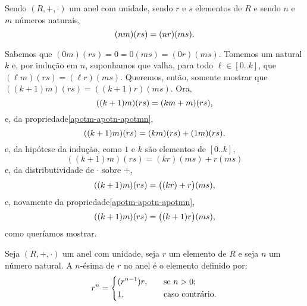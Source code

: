 \begin{Propr}\label{proprnmrsnrms}
  Sendo $(R,+,\cdot)$ um anel com unidade, sendo $r$ e $s$
  elementos de $R$ e
  sendo $n$ e $m$ números naturais,
  \begin{equation*}
    (nm)(rs) = (nr)(ms)\mathrm{.}
  \end{equation*}
\end{Propr}

\begin{dem}
  Sabemos que $(0m)(rs) = 0 = 0(ms) = (0r)(ms)$. Tomemos um natural $k$
  e, por indução em $n$,
  suponhamos que valha, para todo $\ell\in[0..k]$, que $(\ell m)(rs) =
  (\ell r)(ms)$. Queremos, então, somente mostrar que $((k+1)m)(rs) =
  ((k+1)r)(ms)$. Ora,
  \begin{equation*}
      ((k+1)m)(rs) = (km+m)(rs) \mathrm{,}
  \end{equation*}
  e, da propriedade\xspace\ref{apotm-apotn-apotmn},
  \begin{equation*}
    ((k+1)m)(rs) = (km)(rs)+(1m)(rs)\mathrm{,}
  \end{equation*}
  e, da hipótese da indução, como $1$ e $k$ são elementos de $[0..k]$,
  \begin{equation*}
    ((k+1)m)(rs) = (kr)(ms)+r(ms)
  \end{equation*}
  e, da distributividade de $\cdot$ sobre $+$,
  \begin{equation*}
      ((k+1)m)(rs) = \bigl((kr)+r\bigr)(ms)\mathrm{,}
  \end{equation*}
  e, novamente da propriedade\xspace\ref{apotm-apotn-apotmn},
  \begin{equation*}
    ((k+1)m)(rs) = \bigl((k+1)r\bigr)(ms)\mathrm{,}
  \end{equation*}
  como queríamos mostrar.
\end{dem}

\begin{Def}\label{defpotencia}
  Seja $(R,+,\cdot)$ um anel com unidade, seja $r$ um elemento de $R$ e
  seja $n$ um número natural.
  A $n$-ésima  de $r$ no anel
  é o elemento definido por:
  \begin{equation*}
    \simb[$n$-ésima potência de $r$]{r^n} = \left\{
    \begin{aligned}
      &(r^{n-1})r\MMv&\quad&\text{se $n>0$;}\\
      &\um\MMv&\quad&\text{caso contrário.}
    \end{aligned}
    \right.
  \end{equation*}
\end{Def}


